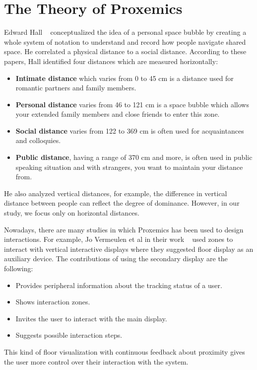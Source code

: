 \section{The Theory of Proxemics}
\label{sec:The Theory of Proxemics}
Edward Hall ~\cite{hall1966hidden,hall1963system} conceptualized the idea of a
personal space bubble by creating a whole system of notation to understand
and record how people navigate shared space.
He correlated a physical distance to a social distance.
According to these papers, Hall identified four distances which are measured horizontally:
\begin{itemize}
  \item \textbf{Intimate distance} which varies from 0 to 45 cm is a distance used for romantic partners and family members.
  \item \textbf{Personal distance} varies from 46 to 121 cm is a space bubble which allows your extended family
        members and close friends to enter this zone.
  \item \textbf{Social distance} varies from 122 to 369 cm is often used for acquaintances and colloquies.
  \item \textbf{Public distance}, having a range of 370 cm and more, is often used in public speaking
        situation and with strangers, you want to maintain your distance from.
\end{itemize}

He also analyzed vertical distances, for example, the difference in vertical distance
between people can reflect the degree of dominance.
However, in our study, we focus only on horizontal distances.

Nowadays, there are many studies in which Proxemics has been used to design interactions.
For example, Jo Vermeulen et al in their work ~\cite{vermeulen2015proxemic} used zones to
interact with vertical interactive displays where they suggested floor display as an auxiliary device.
The contributions of using the secondary display are the following:
\begin{itemize}
    \item Provides peripheral information about the tracking status of a user.
    \item Shows interaction zones.
    \item Invites the user to interact with the main display.
    \item Suggests possible interaction steps.
\end{itemize}
This kind of floor visualization with continuous feedback about proximity gives the user
more control over their interaction with the system.

